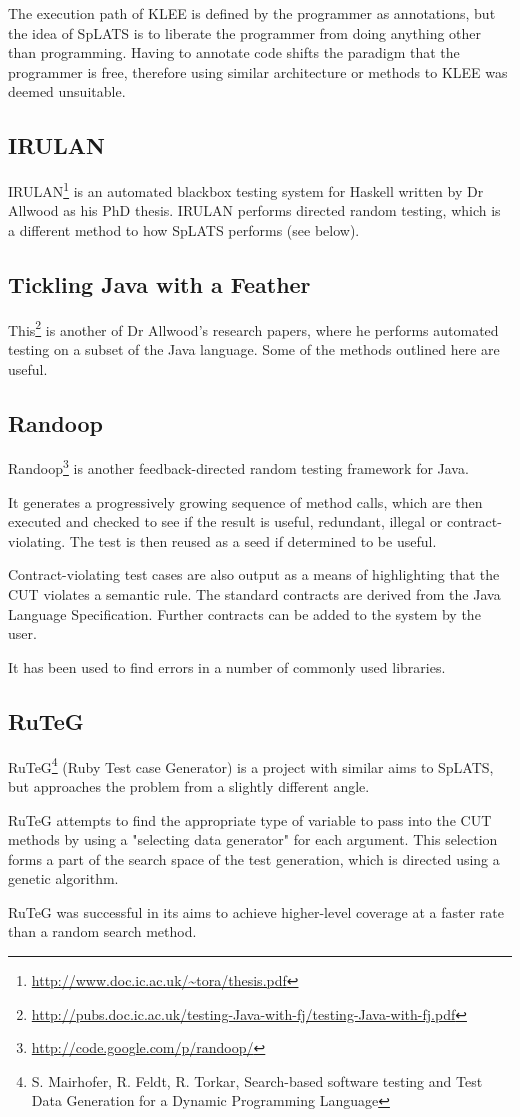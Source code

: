   The execution path of KLEE is defined by the programmer as annotations, but the idea of SpLATS is to liberate the programmer from doing anything other than programming. Having to annotate code shifts the paradigm that the programmer is free, therefore using similar architecture or methods to KLEE was deemed unsuitable.

  \subsection{IRULAN}
    IRULAN\footnote{\url{http://www.doc.ic.ac.uk/~tora/thesis.pdf}} is an automated blackbox testing system for Haskell written by Dr Allwood as his PhD thesis.
    IRULAN performs directed random testing, which is a different method to how SpLATS performs (see below).

  \subsection{Tickling Java with a Feather}
    This\footnote{\url{http://pubs.doc.ic.ac.uk/testing-Java-with-fj/testing-Java-with-fj.pdf}} is another of Dr Allwood's research papers, where he performs automated testing on a subset of the Java language.
    Some of the methods outlined here are useful.

  \subsection{Randoop}
    Randoop\footnote{\url{http://code.google.com/p/randoop/}} is another
feedback-directed random testing framework for Java.

    It generates a progressively growing sequence of method calls, which are
then executed and checked to see if the result is useful, redundant, illegal or
contract-violating. The test is then reused as a seed if determined to be
useful.

    Contract-violating test cases are also output as a means of highlighting
that the CUT violates a semantic rule. The standard contracts are derived from
the Java Language Specification. Further contracts can be added to the system by
the user.

    It has been used to find errors in a number of commonly used libraries.

  \subsection{RuTeG}
    RuTeG\footnote{S. Mairhofer, R. Feldt, R. Torkar, Search-based software
testing and Test Data Generation for a Dynamic Programming Language} (Ruby Test
case Generator) is a project with similar aims to SpLATS, but approaches the
problem from a slightly different angle.

RuTeG attempts to find the appropriate type of variable to pass into the CUT
methods by using a "selecting data generator" for each argument. This selection
forms a part of the search space of the test generation, which is directed using
a genetic algorithm.

RuTeG was successful in its aims to achieve higher-level coverage at a faster
rate than a random search method.
